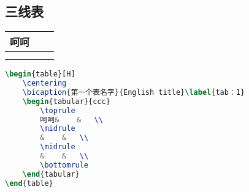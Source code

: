 \subsection{三线表}
\begin{table}[H]
	\centering
	\label{tab：1}
	\begin{tabular}{ccc}
		\toprule
		呵呵&    &   \\
		\midrule
		&    &   \\
		\midrule
		&    &   \\
		\bottomrule
	\end{tabular}
\end{table}
\begin{lstlisting}[language=TeX]
\begin{table}[H]
	\centering
	\bicaption{第一个表名字}{English title}\label{tab：1}
	\begin{tabular}{ccc}
		\toprule
		呵呵&    &   \\
		\midrule
		&    &   \\
		\midrule
		&    &   \\
		\bottomrule
	\end{tabular}
\end{table}
\end{lstlisting}

